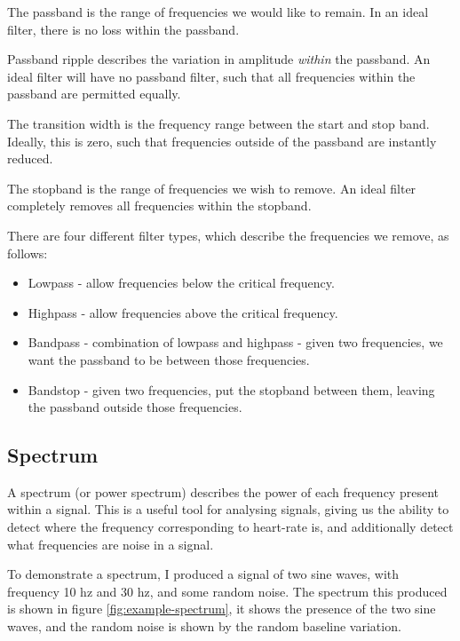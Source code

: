 \documentclass[12pt,a4paper,twoside,openright]{report}
\begin{document}
The passband is the range of frequencies we would like to remain. In an ideal
filter, there is no loss within the passband.

Passband ripple describes the variation in amplitude \emph{within} the
passband. An ideal filter will have no passband filter, such that all
frequencies within the passband are permitted equally.

The transition width is the frequency range between the start and stop band.
Ideally, this is zero, such that frequencies outside of the passband are
instantly reduced.

The stopband is the range of frequencies we wish to remove. An ideal filter
completely removes all frequencies within the stopband.

There are four different filter types, which describe the frequencies we remove, as
follows:

\begin{itemize}
	\item Lowpass - allow frequencies below the critical frequency.

	\item Highpass - allow frequencies above the critical frequency.

	\item Bandpass - combination of lowpass and highpass - given two
		frequencies, we want the passband to be between those
		frequencies.

	\item Bandstop - given two frequencies, put the stopband between them,
		leaving the passband outside those frequencies.
\end{itemize}

\subsection{Spectrum}

A spectrum (or power spectrum) describes the power of each frequency present
within a signal.
This is a useful tool for analysing signals, giving us the ability to detect
where the frequency corresponding to heart-rate is, and additionally detect
what frequencies are noise in a signal.

To demonstrate a spectrum, I produced a signal of two sine waves, with
frequency 10 hz
and 30 hz, and some random noise. The spectrum this produced is shown in 
figure \ref{fig:example-spectrum}, it shows the presence of the two sine
waves, and the random noise is shown by the random baseline variation.
\end{document}
